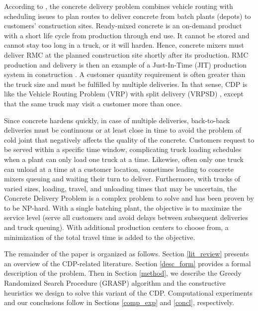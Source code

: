 \documentclass{article}
\begin{document}
{According to \cite{blazewicz2019handbook}, the concrete delivery problem combines vehicle routing with scheduling issues to plan routes to deliver concrete from batch plants (depots) to customers' construction sites. Ready-mixed concrete is an on-demand product with a short life cycle from production through end use. It cannot be stored and cannot stay too long in a truck, or it will harden. Hence, concrete mixers must deliver RMC at the planned construction site shortly after its production. RMC production and delivery is then an example of a Just-In-Time (JIT) production system in construction \citep{tommelein1999just}. A customer quantity requirement is often greater than the truck size and must be fulfilled by multiple deliveries. In that sense, CDP is like the Vehicle Routing Problem (VRP) with split delivery (VRPSD) \citep{archetti2008split}, except that the same truck may visit a customer more than once.

Since concrete hardens quickly, in case of multiple deliveries, back-to-back deliveries must be continuous or at least close in time to avoid the problem of cold joint that negatively affects the quality of the concrete. Customers request to be served within a specific time window, complicating truck loading schedules when a plant can only load one truck at a time. Likewise, often only one truck can unload at a time at a customer location, sometimes leading to concrete mixers queuing and waiting their turn to deliver. Furthermore, with trucks of varied sizes, loading, travel, and unloading times that may be uncertain, the Concrete Delivery Problem is a complex problem to solve and has been proven by \cite{asbach2009analysis} to be NP-hard. With a single batching plant, the objective is to maximize the service level (serve all customers and avoid delays between subsequent deliveries and truck queuing). With additional production centers to choose from, a minimization of the total travel time is added to the objective. %

The remainder of the paper is organized as follows. Section \ref{lit_review} presents an overview of the CDP-related literature.  Section \ref{desc_form} provides a formal description of the problem. Then in Section \ref{method}, we describe the Greedy Randomized Search Procedure (GRASP) algorithm and the constructive heuristics we design to solve this variant of the CDP. Computational experiments and our conclusions follow in Sections \ref{comp_exp} and \ref{concl}, respectively.


}
\end{document}
